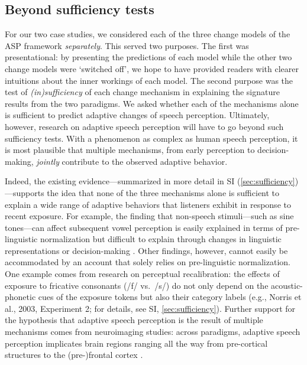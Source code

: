 \documentclass[
  11pt,
  man,floatsintext]{apa6}
\begin{document}
\hypertarget{beyond-sufficiency-tests}{%
\subsection{Beyond sufficiency tests}\label{beyond-sufficiency-tests}}

For our two case studies, we considered each of the three change models of the ASP framework \emph{separately}. This served two purposes. The first was presentational: by presenting the predictions of each model while the other two change models were `switched off', we hope to have provided readers with clearer intuitions about the inner workings of each model. The second purpose was the test of \emph{(in)sufficiency} of each change mechanism in explaining the signature results from the two paradigms. We asked whether each of the mechanisms alone is sufficient to predict adaptive changes of speech perception. Ultimately, however, research on adaptive speech perception will have to go beyond such sufficiency tests. With a phenomenon as complex as human speech perception, it is most plausible that multiple mechanisms, from early perception to decision-making, \emph{jointly} contribute to the observed adaptive behavior.

Indeed, the existing evidence---summarized in more detail in SI (\ref{sec:sufficiency})---supports the idea that none of the three mechanisms alone is sufficient to explain a wide range of adaptive behaviors that listeners exhibit in response to recent exposure. For example, the finding that non-speech stimuli---such as sine tones---can affect subsequent vowel perception \autocites[e.g.,][]{holt2001,holt2006,huang-holt2011} is easily explained in terms of pre-linguistic normalization but difficult to explain through changes in linguistic representations or decision-making \autocite[see also][]{chodroff-wilson2020}. Other findings, however, cannot easily be accommodated by an account that solely relies on pre-linguistic normalization. One example comes from research on perceptual recalibration: the effects of exposure to fricative consonants (/f/ vs.~/s/) do not only depend on the acoustic-phonetic cues of the exposure tokens but also their category labels (e.g., Norris et al., 2003, Experiment 2; for details, see SI, \ref{sec:sufficiency}). Further support for the hypothesis that adaptive speech perception is the result of multiple mechanisms comes from neuroimaging studies: across paradigms, adaptive speech perception implicates brain regions ranging all the way from pre-cortical structures \autocites[e.g., in the brain stem,][]{chandrasekaran2009,polonenko2021,zhao2018} to the (pre-)frontal cortex \autocite{hickok-poeppel2007,blanco-elorriera2021,defenderfer2021}.
\end{document}
